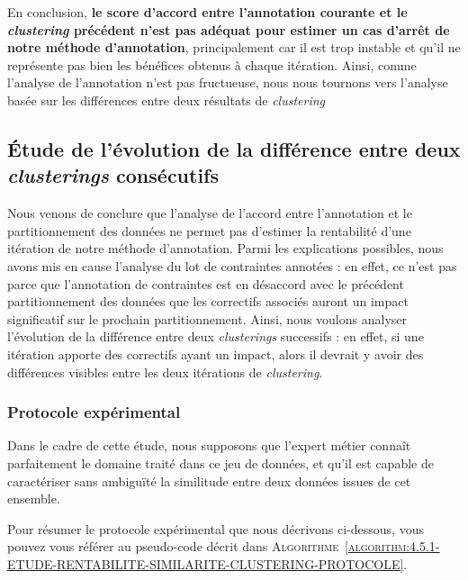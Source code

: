			En conclusion, \textbf{le score d'accord entre l'annotation courante et le \textit{clustering} précédent n'est pas adéquat pour estimer un cas d'arrêt de notre méthode d'annotation}, principalement car il est trop instable et qu'il ne représente pas bien les bénéfices obtenus à chaque itération.
			Ainsi, comme l'analyse de l'annotation n'est pas fructueuse, nous nous tournons vers l'analyse basée sur les différences entre deux résultats de \textit{clustering}
	
	\subsection{Étude de l'évolution de la différence entre deux \textit{clusterings} consécutifs}
	\label{section:4.5.2-ETUDE-RENTABILITE-SIMILARITE-CLUSTERING}
		
		Nous venons de conclure que l'analyse de l'accord entre l'annotation et le partitionnement des données ne permet pas d'estimer la rentabilité d'une itération de notre méthode d'annotation.
		Parmi les explications possibles, nous avons mis en cause l'analyse du lot de contraintes annotées : en effet, ce n'est pas parce que l'annotation de contraintes est en désaccord avec le précédent partitionnement des données que les correctifs associés auront un impact significatif sur le prochain partitionnement.
		Ainsi, nous voulons analyser l'évolution de la différence entre deux \textit{clusterings} successifs : en effet, si une itération apporte des correctifs ayant un impact, alors il devrait y avoir des différences visibles entre les deux itérations de \textit{clustering}.
	
		\subsubsection{Protocole expérimental}
			
			\begin{leftBarWarning}
				Dans le cadre de cette étude, nous supposons que l'expert métier connaît parfaitement le domaine traité dans ce jeu de données, et qu'il est capable de caractériser sans ambiguïté la similitude entre deux données issues de cet ensemble.
			\end{leftBarWarning}
			
			Pour résumer le protocole expérimental que nous décrivons ci-dessous, vous pouvez vous référer au pseudo-code décrit dans \textsc{Algorithme~\ref{algorithm:4.5.1-ETUDE-RENTABILITE-SIMILARITE-CLUSTERING-PROTOCOLE}}.
			
